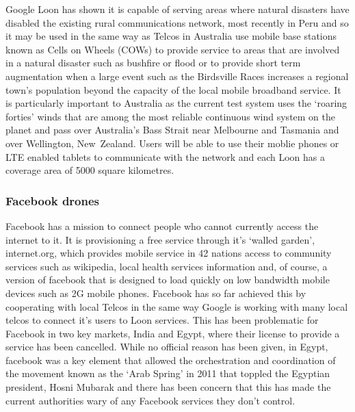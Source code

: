 Google Loon has shown it is capable of serving areas where natural disasters have disabled the existing rural communications network, most recently in Peru and so it may be used in the same way as Telcos in Australia use mobile base stations known as Cells on Wheels (COWs) to provide service to areas that are involved in a natural disaster such as bushfire or flood or to provide short term augmentation when a large event such as the Birdsville Races increases a regional town's population beyond the capacity of the local mobile broadband service\cite{RefWorks:348}. It is particularly important to Australia as the current test system uses the `roaring forties' winds that are among the most reliable continuous wind system on the planet and pass over Australia's Bass Strait  near Melbourne and Tasmania and over Wellington, New~Zealand. Users will be able to use their moblie phones or LTE enabled tablets to communicate with the network and each Loon has a coverage area of 5000 square kilometres\cite{RefWorks:343}.  


\subsubsection{Facebook drones}
Facebook has a mission to connect people who cannot currently access the internet to it. It is provisioning a free service through it's `walled garden', internet.org, which provides mobile service in 42 nations access to community services such as wikipedia, local health services information and, of course, a version of facebook that is designed to load quickly on low bandwidth mobile devices such as 2G mobile phones.  Facebook has so far achieved this by cooperating with local Telcos in the same way Google is working with many local telcos to connect it's users to Loon services. This has been problematic for Facebook in two key markets, India and Egypt, where their license to provide a service has been cancelled. While no official reason has been given, in Egypt, facebook was a key element that allowed the orchestration and coordination of the movement known as the `Arab Spring' in 2011 that toppled the Egyptian president, Hosni Mubarak and there has been concern that this has made the current authorities wary of any Facebook services they don't control\cite{RefWorks:356}.


